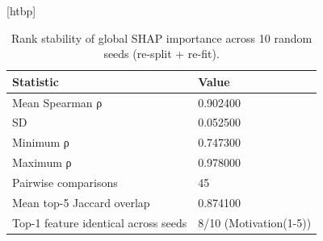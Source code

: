 \begin{table}
\small[htbp]
\caption{Rank stability of global SHAP importance across 10 random seeds (re-split + re-fit).}
\label{tab:T10_shap_stability}
\begin{tabular}{ll}
\toprule
Statistic & Value \\
\midrule
Mean Spearman ρ & 0.902400 \\
SD & 0.052500 \\
Minimum ρ & 0.747300 \\
Maximum ρ & 0.978000 \\
Pairwise comparisons & 45 \\
Mean top-5 Jaccard overlap & 0.874100 \\
Top-1 feature identical across seeds & 8/10 (Motivation(1-5)) \\
\bottomrule
\end{tabular}
\end{table}
